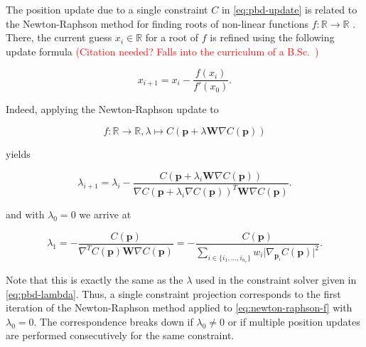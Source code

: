 The position update due to a single constraint $C$ in \cref{eq:pbd-update} is related to the Newton-Raphson method for finding roots of non-linear 
functions $f \colon \mathbb{R} \to \mathbb{R}$ \cite{mueller2006}. There, the current guess $x_i \in \mathbb{R}$ for a root of $f$ is refined 
using the following update formula \textcolor{red}{(Citation needed? Falls into the curriculum of a B.Sc.\ )}

\begin{equation}\label{eq:newton-raphson}
    x_{i+1} = x_i - \frac{f(x_i)}{f\prime(x_0)}.
\end{equation}

\noindent Indeed, applying the Newton-Raphson update to 

\begin{equation}\label{eq:newton-raphson-f}
    f \colon \mathbb{R} \to \mathbb{R}, \lambda \mapsto C(\bm{p} + \lambda \bm{W} \nabla C(\bm{p}))
\end{equation}

\noindent yields

\[
    \lambda_{i+1} = \lambda_i - \frac{C(\bm{p} + \lambda_i \bm{W} \nabla C(\bm{p}))}
    {\nabla C(\bm{p} + \lambda_i \nabla C(\bm{p}))^T \bm{W} \nabla C(\bm{p})}.
\]

\noindent and with $\lambda_0 = 0$ we arrive at 

\[
    \lambda_1 = -\frac{C(\bm{p})}{\nabla^T C(\bm{p}) \bm{W} \nabla C(\bm{p})}
    = - \frac{C(\bm{p})}{\sum_{i \in \{ i_1, \ldots, i_{n_c} \}} w_i \vert \nabla_{\bm{p}_i} C(\bm{p}) \vert^2}.
\]

\noindent Note that this is exactly the same as the $\lambda$ used in the constraint solver given in \cref{eq:pbd-lambda}. Thus, a single 
constraint projection corresponds to the first iteration of the Newton-Raphson method applied to \cref{eq:newton-raphson-f} with 
$\lambda_0 = 0$. The correspondence breaks down if $\lambda_0 \neq 0$ or if multiple position updates are performed consecutively for the 
same constraint.

